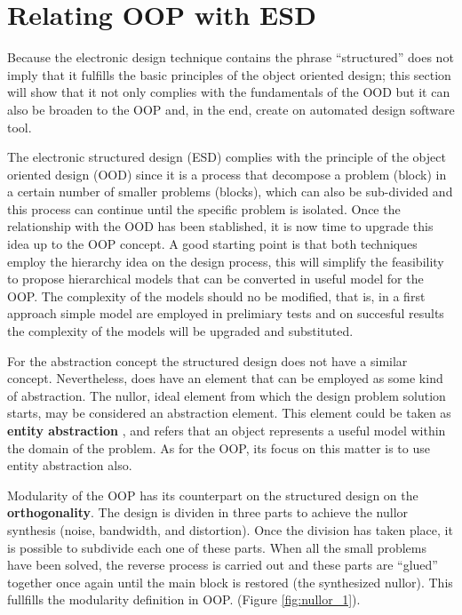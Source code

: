 \documentclass[twocolumn]{IEEEtran}
\begin{document}
\section{Relating OOP with ESD}
Because the electronic design technique contains the phrase ``structured'' does not imply that it fulfills the basic principles of the object oriented design; this section will show that it not only complies with the fundamentals of the OOD but it can also be broaden to the OOP and, in the end, create on automated design software tool.

The electronic structured design (ESD) complies with the principle of the object oriented design (OOD) since it is a process that decompose a problem (block) in a certain number of smaller problems (blocks), which can also be sub-divided and this process can continue until the specific problem is isolated. Once the relationship with the OOD has been stablished, it is now time to upgrade this idea up to the OOP concept. A good starting point is that both techniques employ the hierarchy idea on the design process, this will simplify the feasibility to propose hierarchical models that can be converted in useful model for the OOP. The complexity of the models should no be modified, that is, in a first approach simple model are employed in prelimiary tests and on succesful results the complexity of the models will be upgraded and substituted.


For the abstraction concept the structured design does not have a similar concept. Nevertheless, does have an element that can be employed as some kind of abstraction. The nullor, ideal element from which the design problem solution starts, may be considered an abstraction element. This element could be taken as {\bf entity abstraction} \cite{booch}, and refers that an object represents a useful model within the domain of the problem. As for the OOP, its focus on this matter is to use entity abstraction also.

Modularity of the OOP has its counterpart on the structured design on the {\bf orthogonality}. The design is dividen in three parts to achieve the nullor synthesis (noise, bandwidth, and distortion). Once the division has taken place, it is possible to subdivide each one of these parts. When all the small problems have been solved, the reverse process is carried out and these parts are ``glued'' together once again until the main block is restored (the synthesized nullor). This fullfills the modularity definition in OOP. (Figure \ref{fig:nullor_1}). 
\end{document}
